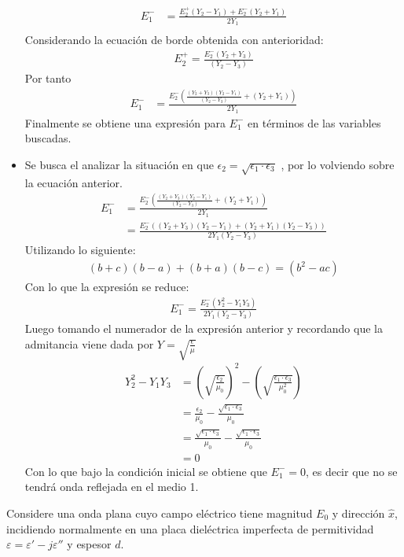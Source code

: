 \documentclass[
  11pt,
  letterpaper,
   addpoints,
   answers
  ]{exam}
\begin{document}
\begin{questions}
\begin{solution}
\begin{itemize}
\begin{align}
      E_{1}^{-} &= \frac{E_{2}^{+}(Y_{2}-Y_{1}) + E_{2}^{-}(Y_{2}+Y_{1})}{2Y_{1}}\\
\end{align}
Considerando la ecuación de borde obtenida con anterioridad:
\begin{align}
    E_{2}^{+}= \frac{E_{2}^{-}(Y_{2}+Y_{3})}{(Y_{2}-Y_{3})}
\end{align}
Por tanto
\begin{align}
      E_{1}^{-} &=  \frac{E_{2}^{-} \left( \frac{(Y_{2}+Y_{3})(Y_{2}-Y_{1})}{(Y_{2}-Y_{3})}+(Y_{2} + Y_{1}) \right)}{2Y_{1}}
\end{align}
Finalmente se obtiene una expresión para $E_{1}^{-}$ en términos de las variables buscadas.
\item Se busca el analizar la situación en que $\epsilon_{2}= \sqrt{\epsilon_{1} \cdot \epsilon_{3}}$ , por lo volviendo sobre la ecuación anterior.
\begin{align}
      E_{1}^{-} &=  \frac{E_{2}^{-} \left( \frac{(Y_{2}+Y_{3})(Y_{2}-Y_{1})}{(Y_{2}-Y_{3})}+(Y_{2} + Y_{1}) \right)}{2Y_{1}}\\
      &= \frac{ E_{2}^{-}( (Y_{2}+ Y_{3}) (Y_{2}-Y_{1}) + (Y_{2}+Y_{1})(Y_{2}-Y_{3}))}{2Y_{1}(Y_{2}-Y_{3})}
\end{align}
Utilizando lo siguiente:
\begin{align}
    (b+c)(b-a)+ (b+a)(b-c) = (b^{2} - ac)
\end{align}
Con lo que la expresión se reduce:
\begin{align}
    E_{1}^{-} = \frac{E_{2}^{-}(Y_{2}^{2} - Y_{1}Y_{3})}{2Y_{1}(Y_{2}-Y_{3})}
\end{align}
Luego tomando el numerador de la expresión anterior y recordando que la admitancia viene dada por $Y= \sqrt{\frac{\epsilon}{\mu}}$
\begin{align}
    Y_{2}^{2} - Y_{1}Y_{3}&= \left( \sqrt{\frac{\epsilon_{2}}{\mu_{0}}} \right)^{2} - \left(\sqrt{\frac{\epsilon_{1} \cdot \epsilon_{3}}{\mu_{0}^{2}}}\right)\\
    &= \frac{\epsilon_{2}}{\mu_{0}} - \frac{\sqrt{\epsilon_{1}\cdot\epsilon_{3}}}{\mu_{0}}\\
    &= \frac{\sqrt{\epsilon_{1}\cdot\epsilon_{3}}}{\mu_{0}} - \frac{\sqrt{\epsilon_{1}\cdot\epsilon_{3}}}{\mu_{0}}\\
    &=0
\end{align}
Con lo que bajo la condición inicial se obtiene que $E_{1}^{-}= 0$, es decir que no se tendrá onda reflejada en el medio 1.
        \end{itemize}
    \end{solution}
    \question 
    Considere una onda plana cuyo campo eléctrico tiene magnitud $E_0$ y dirección $\hat{x}$, incidiendo normalmente en una placa dieléctrica imperfecta de permitividad $\varepsilon = \varepsilon' - j \varepsilon''$ y espesor $d$.


\end{questions}
\end{document}
